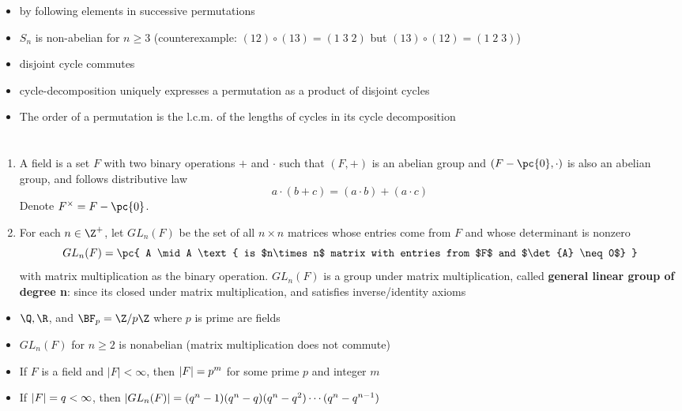 \documentclass[11pt]{article}
\begin{document}
\begin{definition*}
\begin{itemize}
        \item {} by following elements in successive permutations
        \item {} $S_n$ is non-abelian for $n\geq 3$ (counterexample: $(12) \circ(13) = (1\;3\;2)$ but $(13)\circ(12) = (1\;2\;3)$)
        \item {} disjoint cycle commutes
        \item {} cycle-decomposition uniquely expresses a permutation as a product of disjoint cycles
        \item {} The order of a permutation is the l.c.m. of the lengths of cycles in its cycle decomposition
    \end{itemize}
\end{definition*}


\section{}

\begin{definition*}
    \begin{enumerate}
        \item {} A field is a set $F$ with two binary operations $+$ and $\cdot$ such that $(F,+)$ is an abelian group and $(F-\pc{0}, \cdot)$ is also an abelian group, and follows distributive law 
        \[
            a\cdot (b+c) = (a\cdot b) + (a\cdot c)    
        \]
        Denote $F^{\times} = F - \pc{0}$. 
        \item {} For each $n\in\Z^+$, let $GL_n(F)$ be the set of all $n\times n$ matrices whose entries come from $F$ and whose determinant is nonzero
        \[
            GL_n(F) = \pc{
                A \mid A \text{ is $n\times n$ matrix with entries from $F$ and $\det{A} \neq 0$}
            }
        \]
        with matrix multiplication as the binary operation. $GL_n(F)$ is a group under matrix multiplication, called \textbf{general linear group of degree n}: since its closed under matrix multiplication, and satisfies inverse/identity axioms
    \end{enumerate}
    \begin{itemize}
        \item {} $\Q,\R$, and $\BF_p = \integermodn[p]$ where $p$ is prime are fields
        \item {} $GL_n(F)$ for $n\geq 2$ is nonabelian (matrix multiplication does not commute)
        \item {} If $F$ is a field and $|F| < \infty$, then $\left|F\right| = p^m$ for some prime $p$ and integer $m$
        \item {} If $\left|F\right| = q < \infty$, then $\left|GL_n(F)\right| = (q^n - 1)(q^n - q)(q^n-q^2) \cdots (q^n - q^{n-1})$ 
    \end{itemize}
\end{definition*}
\end{document}
